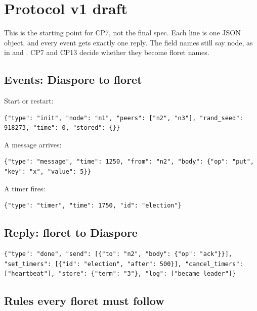 \documentclass[11pt,letterpaper]{article}
\newcommand{\code}[1]{\texttt{\detokenize{#1}}}
\begin{document}
\appendix

\section{Protocol v1 draft}
\label{app:protocol}

This is the starting point for CP7, not the final spec. Each line is one JSON object, and every event gets exactly one reply. The field names still say node, as in \code{node} and \code{nodes}. CP7 and CP13 decide whether they become floret names.

\subsection{Events: Diaspore to floret}

Start or restart:

\begin{lstlisting}[style=json]
{"type": "init", "node": "n1", "peers": ["n2", "n3"], "rand_seed": 918273, "time": 0, "stored": {}}
\end{lstlisting}

A message arrives:

\begin{lstlisting}[style=json]
{"type": "message", "time": 1250, "from": "n2", "body": {"op": "put", "key": "x", "value": 5}}
\end{lstlisting}

A timer fires:

\begin{lstlisting}[style=json]
{"type": "timer", "time": 1750, "id": "election"}
\end{lstlisting}

\subsection{Reply: floret to Diaspore}

\begin{lstlisting}[style=json]
{"type": "done", "send": [{"to": "n2", "body": {"op": "ack"}}], "set_timers": [{"id": "election", "after": 500}], "cancel_timers": ["heartbeat"], "store": {"term": "3"}, "log": ["became leader"]}
\end{lstlisting}

\subsection{Rules every floret must follow}
\end{document}
